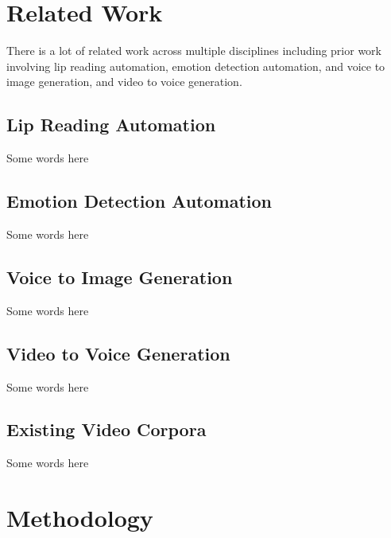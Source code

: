 \documentclass[10pt,twocolumn,letterpaper]{article}
\begin{document}
\section{Related Work}
\label{sec:related}

There is a lot of related work across multiple disciplines including prior work involving lip reading automation, emotion detection automation, and voice to image generation, and video to voice generation. 


\subsection{Lip Reading Automation}

Some words here

\subsection{Emotion Detection Automation}

Some words here

\subsection{Voice to Image Generation}

Some words here

\subsection{Video to Voice Generation}

Some words here

\subsection{Existing Video Corpora}

Some words here

\section{Methodology}
\label{sec:methodology}
\end{document}
